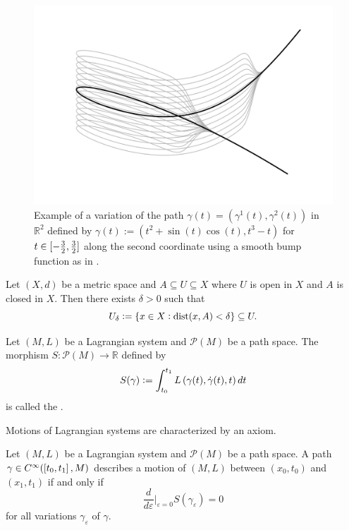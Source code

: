 \begin{example}
	\begin{figure}[h!tb]
		\centering
		\includegraphics[width = .83\textwidth]{variation.pdf}
		\caption{Example of a variation of the path $\gamma(t) = (\gamma^1(t),\gamma^2(t))$ in $\mathbb{R}^2$ defined by $\gamma(t) := (t^2 + \sin(t)\cos(t),t^3 - t)$ for $t \in \intcc[0]{-\frac{3}{2},\frac{3}{2}}$ along the second coordinate using a smooth bump function as in \cite[42]{lee:smooth_manifolds:2013}.}
		\label{fig:variation}
	\end{figure}
\end{example}

\begin{exercise}
	\label{ex:U_delta_neighbourhood}
	Let $(X,d)$ be a metric space and $A \subseteq U \subseteq X$ where $U$ is open in $X$ and $A$ is closed in $X$. Then there exists $\delta > 0$ such that
	\begin{equation*}
		U_\delta := \cbr[0]{x \in X : \dist(x,A) < \delta} \subseteq U.
	\end{equation*}
\end{exercise}

\begin{definition}
	\label{def:action_functional}
	Let $(M,L)$ be a Lagrangian system and $\mathcal{P}(M)$ be a path space. The morphism $S : \mathcal{P}(M) \to \mathbb{R}$ defined by
	\begin{equation*}
		S(\gamma) := \int_{t_0}^{t_1} L\del[0]{\gamma(t),\dot{\gamma}(t),t} dt
	\end{equation*}
	\noindent is called the .
\end{definition}

Motions of Lagrangian systems are characterized by an axiom.

\begin{axiom}
	\label{ax:Hamilton_least_action}
	Let $(M,L)$ be a Lagrangian system and $\mathcal{P}(M)$ be a path space. A path $\gamma \in C^\infty(\intcc[0]{t_0,t_1},M)$ describes a motion of $(M,L)$ between $(x_0,t_0)$ and $(x_1,t_1)$ if and only if 
	\begin{equation}
		\frac{d}{d\varepsilon}\bigg\vert_{\varepsilon = 0} S(\gamma_\varepsilon) = 0
	\end{equation}
	\noindent for all variations $\gamma_\varepsilon$ of $\gamma$.
\end{axiom}

